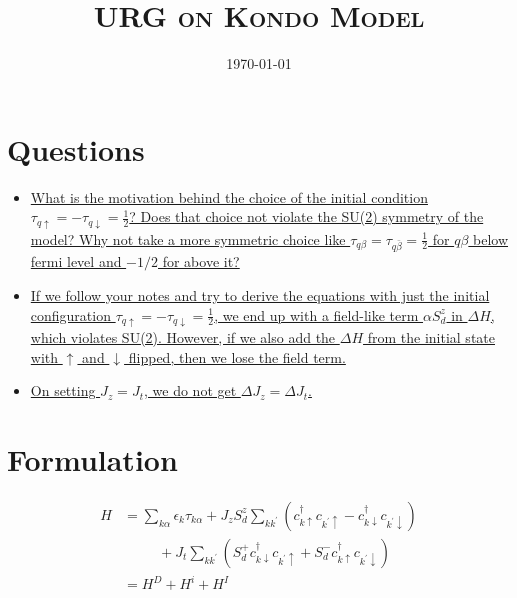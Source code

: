 \documentclass[14pt]{extarticle}
\author{}
\date{\today}
\title{\textsc{URG on Kondo Model}}
\numberwithin{equation}{section}
\begin{document}
\maketitle
\tableofcontents
\newpage
\section{Questions}
\begin{itemize}
	\item \hyperlink{q1}{ What is the motivation behind the choice of the initial condition $\tau_{q \uparrow} = -\tau_{q\downarrow} = \frac{1}{2}$? Does that choice not violate the SU(2) symmetry of the model? Why not take a more symmetric choice like $\tau_{q\beta} =  \tau_{q\bar{\beta}} = \frac{1}{2}$ for $q\beta$ below fermi level and $-1/2$ for above it?}\\[10pt]
	\item \hyperlink{field}{If we follow your notes and try to derive the equations with just the initial configuration $\tau_{q \uparrow} = -\tau_{q\downarrow} = \frac{1}{2}$, we end up with a field-like term \(\alpha S_d^z\) in \(\Delta H\), which violates SU(2). However, if we also add the \(\Delta H\) from the initial state with \(\uparrow\) and \(\downarrow\) flipped, then we lose the field term.}\\[10pt]
	\item \hyperlink{q3}{On setting \(J_z=J_t\), we do not get \(\Delta J_z = \Delta J_t\).}
\end{itemize}

\newpage
\section{Formulation}

\begin{align}
 H &= \sum\limits_{k \alpha} \epsilon_k \tau_{k\alpha} + J_z S_d^z \sum\limits_{kk^{\prime}} \left( c^{\dag}_{k\uparrow}c_{k^{\prime}\uparrow} - c^{\dag}_{k\downarrow}c_{k^{\prime}\downarrow} \right) \nonumber\\
& \hspace{30pt} + J_t \sum\limits_{kk^{\prime}} \left( S_d^+ c^{\dag}_{k\downarrow}c_{k^{\prime}\uparrow} + S_d^- c^{\dag}_{k\uparrow}c_{k^{\prime}\downarrow} \right) \label{eq:a32} \\
&= H^D + H^i + H^I \nonumber
\end{align}
\end{document}
